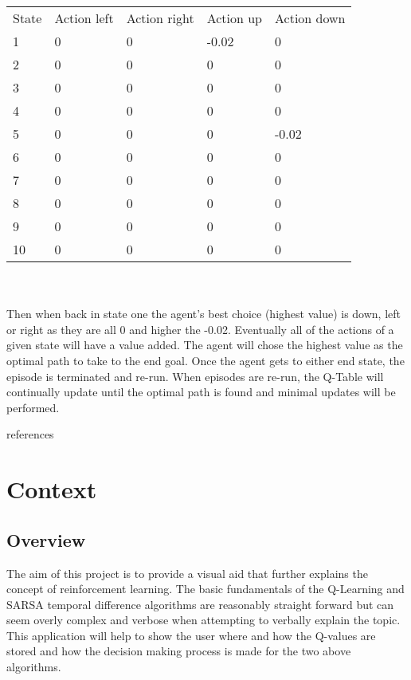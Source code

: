 	\begin{tabular}{lllll}
		State & Action left & Action right & Action up & Action down \\
		1     & 0           & 0            & -0.02     & 0           \\
		2     & 0           & 0            & 0         & 0           \\
		3     & 0           & 0            & 0         & 0           \\
		4     & 0           & 0            & 0         & 0           \\
		5     & 0           & 0            & 0         & -0.02       \\
		6     & 0           & 0            & 0         & 0           \\
		7     & 0           & 0            & 0         & 0           \\
		8     & 0           & 0            & 0         & 0           \\
		9     & 0           & 0            & 0         & 0           \\
		10    & 0           & 0            & 0         & 0          
	\end{tabular}
\\
\\
Then when back in state one the agent’s best choice (highest value) is down, left or right as they are all 0 and higher the -0.02. Eventually all of the actions of a given state will have a value added. The agent will chose the highest value as the optimal path to take to the end goal. 
Once the agent gets to either end state, the episode is terminated and re-run. When episodes are re-run, the Q-Table will continually update until the optimal path is found and minimal updates will be performed.

 references~\cite{einstein,knuthwebsite,latexcompanion,1introup63:online}

\chapter{Context}

\section{Overview}
The aim of this project is to provide a visual aid that further explains the concept of reinforcement learning. The basic fundamentals of the Q-Learning and SARSA temporal difference algorithms are reasonably straight forward but can seem overly complex and verbose when attempting to verbally explain the topic. This application will help to show the user where and how the Q-values are stored and how the decision making process is made for the two above algorithms.

